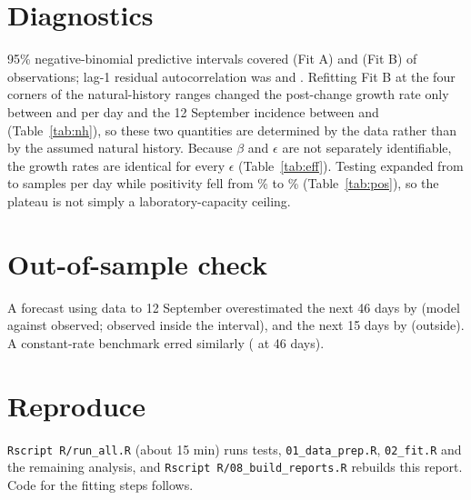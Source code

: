\documentclass[10pt,a4paper]{article}
\begin{document}
\section{Diagnostics}
95\% negative-binomial predictive intervals covered \fitAcover{} (Fit A) and \fitBcover{} (Fit B) of observations; lag-1 residual autocorrelation was \fitAacf{} and \fitBacf. Refitting Fit B at the four corners of the natural-history ranges changed the post-change growth rate only between \nhRMin{} and \nhRMax{} per day and the 12 September incidence between \nhIncMin{} and \nhIncMax{} (Table~\ref{tab:nh}), so these two quantities are determined by the data rather than by the assumed natural history. Because $\beta$ and $\epsilon$ are not separately identifiable, the growth rates are identical for every $\epsilon$ (Table~\ref{tab:eff}). Testing expanded from \testsJun{} to \testsSep{} samples per day while positivity fell from \posJun\% to \posSep\% (Table~\ref{tab:pos}), so the plateau is not simply a laboratory-capacity ceiling.
\begin{table}[H]\centering\small\caption{Fit B refitted at extreme natural-history values.}\label{tab:nh}\end{table}
\begin{table}[H]\centering\small\caption{Fit by isolation effectiveness.}\label{tab:eff}\end{table}
\begin{table}[H]\centering\small\caption{Testing and positivity by month.}\label{tab:pos}\end{table}

\section{Out-of-sample check}
A forecast using data to 12 September overestimated the next 46 days by \valErrLong{} (model \valModLongCI{} against \valObsLong{} observed; observed inside the interval), and the next 15 days by \valErrShort{} (outside). A constant-rate benchmark erred similarly (\valNaiveErrLong{} at 46 days).

\section{Reproduce}
\texttt{Rscript R/run\_all.R} (about 15 min) runs tests, \texttt{01\_data\_prep.R}, \texttt{02\_fit.R} and the remaining analysis, and \texttt{Rscript R/08\_build\_reports.R} rebuilds this report. Code for the fitting steps follows.
\end{document}
